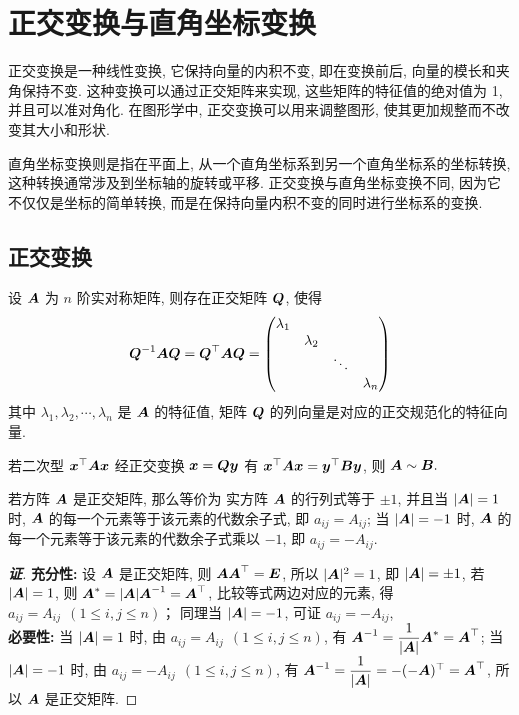 \section{正交变换与直角坐标变换}

正交变换是一种线性变换, 它保持向量的内积不变, 即在变换前后, 向量的模长和夹角保持不变. 这种变换可以通过正交矩阵来实现, 这些矩阵的特征值的绝对值为 1, 并且可以准对角化. 在图形学中, 正交变换可以用来调整图形, 使其更加规整而不改变其大小和形状. 

直角坐标变换则是指在平面上, 从一个直角坐标系到另一个直角坐标系的坐标转换, 这种转换通常涉及到坐标轴的旋转或平移. 正交变换与直角坐标变换不同, 因为它不仅仅是坐标的简单转换, 而是在保持向量内积不变的同时进行坐标系的变换. 

\subsection{正交变换}

\begin{definition}[正交矩阵]
    设 $\vb*{A}$ 为 $n$ 阶实对称矩阵, 则存在正交矩阵 $\vb*{Q}$, 使得
    $$\vb*{Q}^{-1}\vb*{AQ}=\vb*{Q}^\top\vb*{AQ}=\mqty(\dmat{\lambda_1,\lambda_2,\ddots,\lambda_n})$$
    其中 $\lambda_1,\lambda_2,\cdots,\lambda_n$ 是 $\vb*{A}$ 的特征值, 矩阵 $\vb*{Q}$ 的列向量是对应的正交规范化的特征向量.
\end{definition}

\begin{theorem}[正交变换与相似]
    若二次型 $\vb*{x}^\top\vb*{Ax}$ 经正交变换 $\vb*{x}=\vb*{Qy}$ 有 $\vb*{x}^\top\vb*{Ax}=\vb*{y}^\top\vb*{By}$, 则 $\vb*{A}\sim\vb*{B}.$
\end{theorem}

\begin{theorem}[正交矩阵的行列式]
    若方阵 $\vb*{A}$ 是正交矩阵, 那么等价为 实方阵 $\vb*{A}$ 的行列式等于 $\pm1$, 并且当 $|\vb*{A}|=1$ 时, $\vb*{A}$ 的每一个元素等于该元素的代数余子式, 即 $a_{ij}=A_{ij}$;
    当 $|\vb*{A}|=-1$ 时, $\vb*{A}$ 的每一个元素等于该元素的代数余子式乘以 $-1$, 即 $a_{ij}=-A_{ij}.$
\end{theorem}
\begin{proof}[{\songti \textbf{证}}]
    \textbf{充分性: }设 $\vb*{A}$ 是正交矩阵, 则 $\vb*{AA}^\top=\vb*{E}$, 所以 $|\vb*{A}|^2=1$, 即 $|\vb*{A}|=\pm1$, 若 $|\vb*{A}|=1$, 则 $\vb*{A}^*=|\vb*{A}|\vb*{A}^{-1}=\vb*{A}^\top$, 比较等式两边对应的元素, 得 $a_{ij}=A_{ij}~~(1\leqslant i,j\leqslant n)$；
    同理当 $|\vb*{A}|=-1$, 可证 $a_{ij}=-A_{ij}$, \\
    \textbf{必要性: }当 $|\vb*{A}|=1$ 时, 由 $a_{ij}=A_{ij}~~(1\leqslant i,j\leqslant n)$, 有 $\vb*{A}^{-1}=\dfrac{1}{|\vb*{A}|}\vb*{A}^*=\vb*{A}^\top$; 当 $|\vb*{A}|=-1$ 时, 由 $a_{ij}=-A_{ij}~~(1\leqslant i,j\leqslant n)$, 有 $\vb*{A}^{-1}=\dfrac{1}{|\vb*{A}|}=-(-\vb*{A})^\top=\vb*{A}^\top$, 所以 $\vb*{A}$ 是正交矩阵.
\end{proof}


